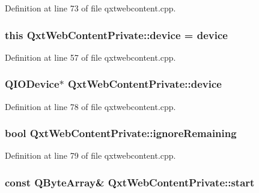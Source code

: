 Definition at line 73 of file qxtwebcontent.\-cpp.

\hypertarget{class_qxt_web_content_private_a77782ebb89b1d603985a8e8ce05e4e2d}{
\subsubsection[{device}]{\setlength{\rightskip}{0pt plus 5cm}this Qxt\-Web\-Content\-Private\-::device = device}}\label{class_qxt_web_content_private_a77782ebb89b1d603985a8e8ce05e4e2d}


Definition at line 57 of file qxtwebcontent.\-cpp.

\hypertarget{class_qxt_web_content_private_a309c713920693032a8b46b8f8f22b562}{
\subsubsection[{device}]{\setlength{\rightskip}{0pt plus 5cm}Q\-I\-O\-Device$\ast$ Qxt\-Web\-Content\-Private\-::device}}\label{class_qxt_web_content_private_a309c713920693032a8b46b8f8f22b562}


Definition at line 78 of file qxtwebcontent.\-cpp.

\hypertarget{class_qxt_web_content_private_a7f5ec555a045feec02bebf526b6d7ef9}{
\subsubsection[{ignore\-Remaining}]{\setlength{\rightskip}{0pt plus 5cm}bool Qxt\-Web\-Content\-Private\-::ignore\-Remaining}}\label{class_qxt_web_content_private_a7f5ec555a045feec02bebf526b6d7ef9}


Definition at line 79 of file qxtwebcontent.\-cpp.

\hypertarget{class_qxt_web_content_private_a418146d8701fb35c2720c16c56213b90}{
\subsubsection[{start}]{\setlength{\rightskip}{0pt plus 5cm}const Q\-Byte\-Array\& Qxt\-Web\-Content\-Private\-::start}}\label{class_qxt_web_content_private_a418146d8701fb35c2720c16c56213b90}


